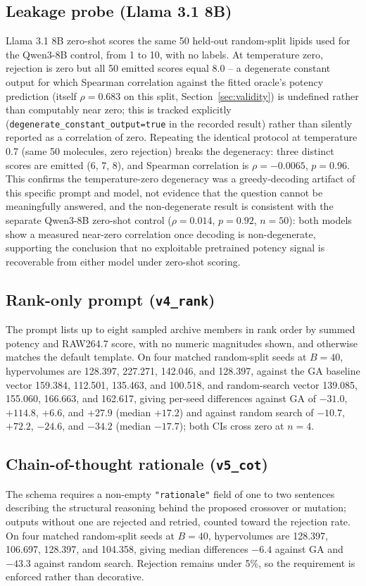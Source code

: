 \subsection{Leakage probe (Llama 3.1 8B)}
Llama 3.1 8B zero-shot scores the same 50 held-out random-split lipids used for the Qwen3-8B control, from 1 to 10, with no labels. At temperature zero, rejection is zero but all 50 emitted scores equal 8.0 -- a degenerate constant output for which Spearman correlation against the fitted oracle's potency prediction (itself $\rho=0.683$ on this split, Section~\ref{sec:validity}) is undefined rather than computably near zero; this is tracked explicitly (\texttt{degenerate\_constant\_output=true} in the recorded result) rather than silently reported as a correlation of zero. Repeating the identical protocol at temperature 0.7 (same 50 molecules, zero rejection) breaks the degeneracy: three distinct scores are emitted (6, 7, 8), and Spearman correlation is $\rho=-0.0065$, $p=0.96$. This confirms the temperature-zero degeneracy was a greedy-decoding artifact of this specific prompt and model, not evidence that the question cannot be meaningfully answered, and the non-degenerate result is consistent with the separate Qwen3-8B zero-shot control ($\rho=0.014$, $p=0.92$, $n=50$): both models show a measured near-zero correlation once decoding is non-degenerate, supporting the conclusion that no exploitable pretrained potency signal is recoverable from either model under zero-shot scoring.

\subsection{Rank-only prompt (\texttt{v4\_rank})}
\label{app:v4rank}
The prompt lists up to eight sampled archive members in rank order by summed potency and RAW264.7 score, with no numeric magnitudes shown, and otherwise matches the default template. On four matched random-split seeds at $B=40$, hypervolumes are 128.397, 227.271, 142.046, and 128.397, against the GA baseline vector 159.384, 112.501, 135.463, and 100.518, and random-search vector 139.085, 155.060, 166.663, and 162.617, giving per-seed differences against GA of $-31.0$, $+114.8$, $+6.6$, and $+27.9$ (median $+17.2$) and against random search of $-10.7$, $+72.2$, $-24.6$, and $-34.2$ (median $-17.7$); both CIs cross zero at $n=4$.

\subsection{Chain-of-thought rationale (\texttt{v5\_cot})}
\label{app:cot}
The schema requires a non-empty \texttt{"rationale"} field of one to two sentences describing the structural reasoning behind the proposed crossover or mutation; outputs without one are rejected and retried, counted toward the rejection rate. On four matched random-split seeds at $B=40$, hypervolumes are 128.397, 106.697, 128.397, and 104.358, giving median differences $-6.4$ against GA and $-43.3$ against random search. Rejection remains under 5\%, so the requirement is enforced rather than decorative.

